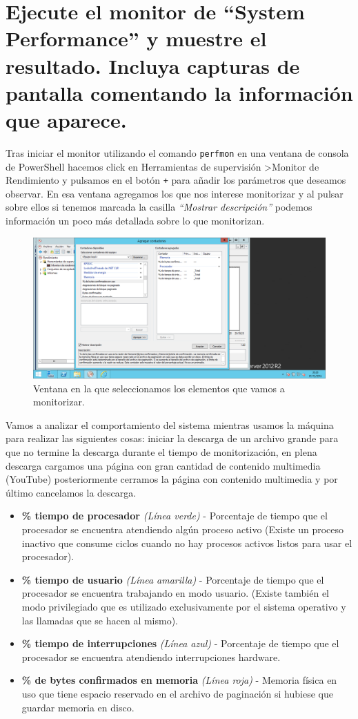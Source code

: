 \section{Ejecute el monitor de “System Performance” y muestre el resultado. Incluya capturas de pantalla comentando la información que aparece.}
Tras iniciar el monitor utilizando el comando \verb|perfmon| en una ventana de consola de PowerShell hacemos click en Herramientas de supervisión \textgreater Monitor de Rendimiento y pulsamos en el botón \verb|+| para añadir los parámetros que deseamos observar. En esa ventana agregamos los que nos interese monitorizar y al pulsar sobre ellos si tenemos marcada la casilla \textit{``Mostrar descripción''} podemos información un poco más detallada sobre lo que monitorizan. \cite{c4}
\begin{figure}[H]
	\centering
	\includegraphics[scale=0.4]{perfmonContadores.png}
	\caption{Ventana en la que seleccionamos los elementos que vamos a monitorizar.}
\end{figure}

Vamos a analizar el comportamiento del sistema mientras usamos la máquina para realizar las siguientes cosas: iniciar la descarga de un archivo grande para que no termine la descarga durante el tiempo de monitorización, en plena descarga cargamos una página con gran cantidad de contenido multimedia (YouTube) posteriormente cerramos la página con contenido multimedia y por último cancelamos la descarga.

\begin{itemize}
  \item \textbf{\% tiempo de procesador} \textit{(Línea verde)} - Porcentaje de tiempo que el procesador se encuentra atendiendo algún proceso activo (Existe un proceso inactivo que consume ciclos cuando no hay procesos activos listos para usar el procesador).
  \item \textbf{\% tiempo de usuario} \textit{(Línea amarilla)} - Porcentaje de tiempo que el procesador se encuentra trabajando en modo usuario. (Existe también el modo privilegiado que es utilizado exclusivamente por el sistema operativo y las llamadas que se hacen al mismo).
  \item \textbf{\% tiempo de interrupciones} \textit{(Línea azul)} - Porcentaje de tiempo que el procesador se encuentra atendiendo interrupciones hardware.
  \item \textbf{\% de bytes confirmados en memoria} \textit{(Línea roja)} - Memoria física en uso que tiene espacio reservado en el archivo de paginación si hubiese que guardar memoria en disco.
\end{itemize}

